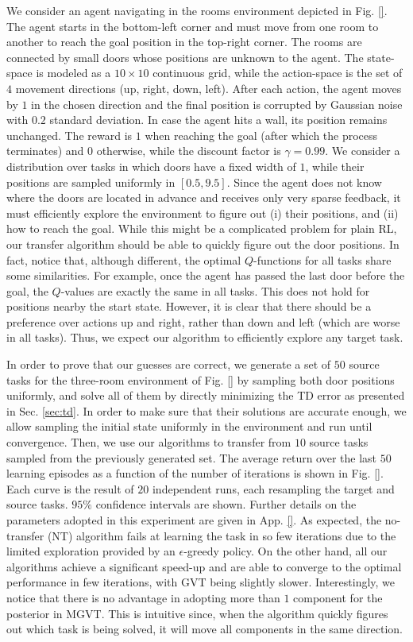 \documentclass{article}
\begin{document}
We consider an agent navigating in the rooms environment depicted in Fig. \ref{}. The agent starts in the bottom-left corner and must move from one room to another to reach the goal position in the top-right corner. The rooms are connected by small doors whose positions are unknown to the agent. The state-space is modeled as a $10 \times 10$ continuous grid, while the action-space is the set of $4$ movement directions (up, right, down, left). After each action, the agent moves by $1$ in the chosen direction and the final position is corrupted by Gaussian noise with $0.2$ standard deviation. In case the agent hits a wall, its position remains unchanged. The reward is $1$ when reaching the goal (after which the process terminates) and $0$ otherwise, while the discount factor is $\gamma = 0.99$. We consider a distribution over tasks in which doors have a fixed width of $1$, while their positions are sampled uniformly in $[0.5,9.5]$. Since the agent does not know where the doors are located in advance and receives only very sparse feedback, it must efficiently explore the environment to figure out (i) their positions, and (ii) how to reach the goal. While this might be a complicated problem for plain RL, our transfer algorithm should be able to quickly figure out the door positions. In fact, notice that, although different, the optimal $Q$-functions for all tasks share some similarities. For example, once the agent has passed the last door before the goal, the $Q$-values are exactly the same in all tasks. This does not hold for positions nearby the start state. However, it is clear that there should be a preference over actions up and right, rather than down and left (which are worse in all tasks). Thus, we expect our algorithm to efficiently explore any target task.

In order to prove that our guesses are correct, we generate a set of $50$ source tasks for the three-room environment of Fig. \ref{} by sampling both door positions uniformly, and solve all of them by directly minimizing the TD error as presented in Sec. \ref{sec:td}. In order to make sure that their solutions are accurate enough, we allow sampling the initial state uniformly in the environment and run until convergence. Then, we use our algorithms to transfer from $10$ source tasks sampled from the previously generated set. The average return over the last $50$ learning episodes as a function of the number of iterations is shown in Fig. \ref{}. Each curve is the result of $20$ independent runs, each resampling the target and source tasks. $95\%$ confidence intervals are shown. Further details on the parameters adopted in this experiment are given in App. \ref{}. As expected, the no-transfer (NT) algorithm fails at learning the task in so few iterations due to the limited exploration provided by an $\epsilon$-greedy policy. On the other hand, all our algorithms achieve a significant speed-up and are able to converge to the optimal performance in few iterations, with GVT being slightly slower. Interestingly, we notice that there is no advantage in adopting more than $1$ component for the posterior in MGVT. This is intuitive since, when the algorithm quickly figures out which task is being solved, it will move all components in the same direction.
\end{document}

